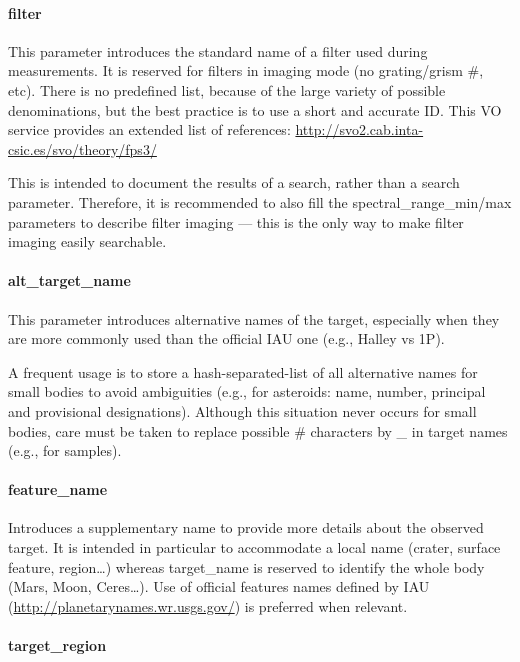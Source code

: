 \documentclass[11pt,a4paper]{ivoa}
\begin{document}
\paragraph{filter}

This parameter introduces the standard name of a filter used during
measurements. It is reserved for filters in imaging mode (no
grating/grism \#, etc). There is no predefined list, because of the large
variety of possible denominations, but the best practice is to use a short
and accurate ID. This VO service provides an extended list of references:
\url{http://svo2.cab.inta-csic.es/svo/theory/fps3/}

This is intended to document the results of a search, rather than
a search parameter. Therefore, it is recommended to also fill the
spectral\_range\_min/max parameters to describe filter imaging --- this
is the only way to make filter imaging easily searchable.

\paragraph{alt\_target\_name}

This parameter introduces alternative names of the target, especially
when they are more commonly used than the official IAU one (e.g., Halley vs 1P).

A frequent usage is to store a hash-separated-list of all alternative
names for small bodies to avoid ambiguities (e.g., for asteroids: name,
number, principal and provisional designations). Although this situation
never occurs for small bodies, care must be taken to replace possible \#
characters by \_ in target names (e.g., for samples).

\paragraph{feature\_name}

Introduces a supplementary name to provide more details
about the observed target. It is intended in particular to
accommodate a local name (crater, surface feature, region…)
whereas target\_name is reserved to identify the whole body
(Mars, Moon, Ceres…). Use of official features names defined by IAU
(\url{http://planetarynames.wr.usgs.gov/})
is preferred when relevant.

\paragraph{target\_region}
\end{document}
